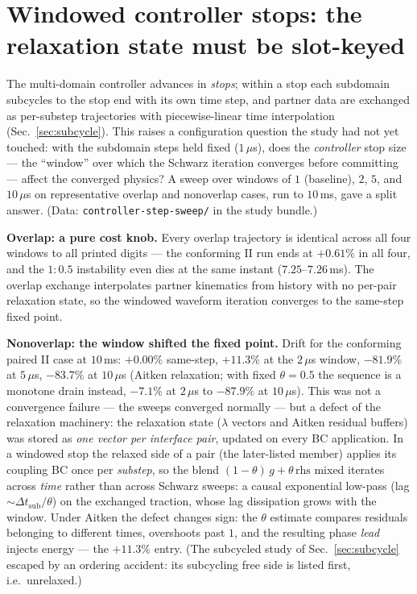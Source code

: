 \documentclass[11pt]{article}
\newcommand{\code}[1]{\texttt{#1}}
\begin{document}
\section{Windowed controller stops: the relaxation state must be
slot-keyed}
\label{sec:windowed}

The multi-domain controller advances in \emph{stops}; within a stop each
subdomain subcycles to the stop end with its own time step, and partner
data are exchanged as per-substep trajectories with piecewise-linear time
interpolation (Sec.~\ref{sec:subcycle}). This raises a configuration
question the study had not yet touched: with the subdomain steps held
fixed ($1\,\mu$s), does the \emph{controller} stop size --- the
``window'' over which the Schwarz iteration converges before committing
--- affect the converged physics? A sweep over windows of $1$ (baseline),
$2$, $5$, and $10\,\mu$s on representative overlap and nonoverlap cases,
run to $10$\,ms, gave a split answer. (Data:
\code{controller-step-sweep/} in the study bundle.)

\textbf{Overlap: a pure cost knob.} Every overlap trajectory is identical
across all four windows to all printed digits --- the conforming II run
ends at $+0.61\%$ in all four, and the $1{:}0.5$ instability even dies at
the same instant ($7.25$--$7.26$\,ms). The overlap exchange interpolates
partner kinematics from history with no per-pair relaxation state, so the
windowed waveform iteration converges to the same-step fixed point.

\textbf{Nonoverlap: the window shifted the fixed point.} Drift for the
conforming paired II case at $10$\,ms: $+0.00\%$ same-step, $+11.3\%$ at
the $2\,\mu$s window, $-81.9\%$ at $5\,\mu$s, $-83.7\%$ at $10\,\mu$s
(Aitken relaxation; with fixed $\theta = 0.5$ the sequence is a monotone
drain instead, $-7.1\%$ at $2\,\mu$s to $-87.9\%$ at $10\,\mu$s). This
was not a convergence failure --- the sweeps converged normally --- but a
defect of the relaxation machinery: the relaxation state
($\lambda$ vectors and Aitken residual buffers) was stored as \emph{one
vector per interface pair}, updated on every BC application. In a
windowed stop the relaxed side of a pair (the later-listed member)
applies its coupling BC once per \emph{substep}, so the blend
$(1-\theta)\,g + \theta\,\mathrm{rhs}$ mixed iterates across \emph{time}
rather than across Schwarz sweeps: a causal exponential low-pass (lag
$\sim \Delta t_{\mathrm{sub}}/\theta$) on the exchanged traction, whose
lag dissipation grows with the window. Under Aitken the defect changes
sign: the $\theta$ estimate compares residuals belonging to different
times, overshoots past $1$, and the resulting phase \emph{lead} injects
energy --- the $+11.3\%$ entry. (The subcycled study of
Sec.~\ref{sec:subcycle} escaped by an ordering accident: its subcycling
free side is listed first, i.e.\ unrelaxed.)
\end{document}
